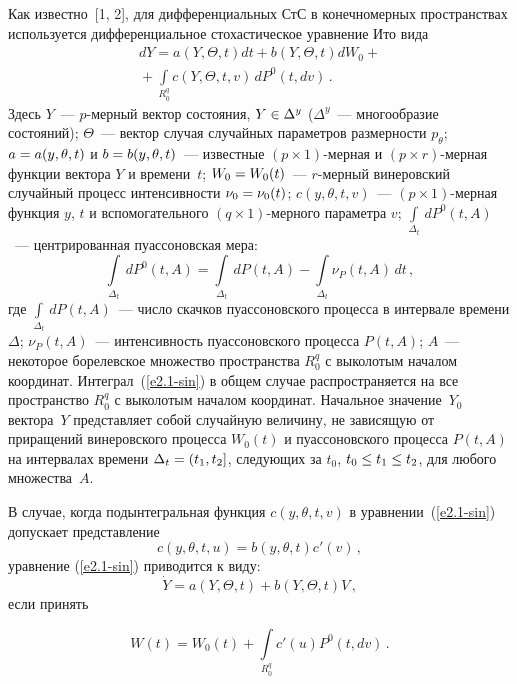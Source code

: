 \begin{multicols}{2}
Как известно~[1, 2], для дифференциальных  СтС в
конечномерных пространствах используется дифференциальное стохастическое
уравнение Ито вида
\begin{multline}
dY= a (Y,\Theta,t) dt + b(Y,\Theta,t) d W_0 +{}\\{}+ \int\limits_{R_0^q} c(Y,\Theta,t,v)\, dP^0 (t, dv)\,.\label{e2.1-sin}
\end{multline}
Здесь $Y$~--- $p$-мер\-ный вектор состояния, $Y\hm\in \Delta^y$ ($\Delta^y$~--- многообразие состояний); 
$\Theta$~--- вектор случая случайных параметров размерности $p_\theta$;
$a\hm=a (y,\theta,t)$ и $b\hm= b(y,\theta,t)$~--- известные $(p\times 1)$-мер\-ная и
$(p\times r)$-мер\-ная функции вектора $Y$ и времени~$t$; $W_0\hm= W_0(t)$~---
$r$-мерный винеровский случайный процесс интенсивности $\nu_0\hm=
\nu_0(t)$; $c(y,\theta,t,v)$~--- $(p\times 1)$-мер\-ная функция $y$, $t$ и вспомогательного
$(q\times 1)$-мер\-но\-го параметра $v$; $\int\limits_{\Delta_t}\, d P^0 (t,A)$~--- центрированная пуассоновская мера:
\begin{equation*}
\int\limits_{\Delta_t}\, dP^0 (t,A)= \int\limits_{\Delta_t} \,dP (t,A)-
    \int\limits_{\Delta_t} \nu_P (t,A)\, dt\,, %
    \end{equation*}
где $\int\limits_{\Delta_t}\, dP (t,A)$~--- число скачков пуассоновского
процесса в интервале времени $\Delta$; $\nu_P (t,A)$~--- интенсивность
пуассоновского процесса $P(t,A)$; $A$~--- некоторое борелевское
множество пространства $R^q_0$ с выколотым началом координат.
Интеграл~(\ref{e2.1-sin}) в общем случае распространяется на все пространство
$R_0^q$ с выколотым началом координат.
Начальное значение~$Y_0$ вектора~$Y$ представляет
собой случайную величину, не зависящую от приращений винеровского
процесса $W_0(t)$ и пуассоновского процесса $P(t,A)$ на интервалах
времени $\Delta_t \hm= (t_1, t_2]$, следующих за $t_0$, $t_0\hm\le t_1\hm\le t_2$,
для любого множества~$A$.

В случае, когда подынтегральная функция $c(y,\theta,t,v)$ в уравнении~(\ref{e2.1-sin})
допускает представление
\begin{equation}
c(y,\theta,t,u)= b(y,\theta,t) c'(v)\,,\label{e2.3-sin}
\end{equation}
уравнение (\ref{e2.1-sin}) приводится к  виду:
\begin{equation}
{\dot Y} = a (Y,\Theta,t) +b(Y,\Theta,t)V\,,\label{e2.4-sin}
\end{equation}
если принять

\noindent
    \begin{equation*}
    W(t)= W_0(t) +\int\limits_{R_0^q} c'(u) P^0 (t, dv)\,. %
    \end{equation*}


\end{multicols}
